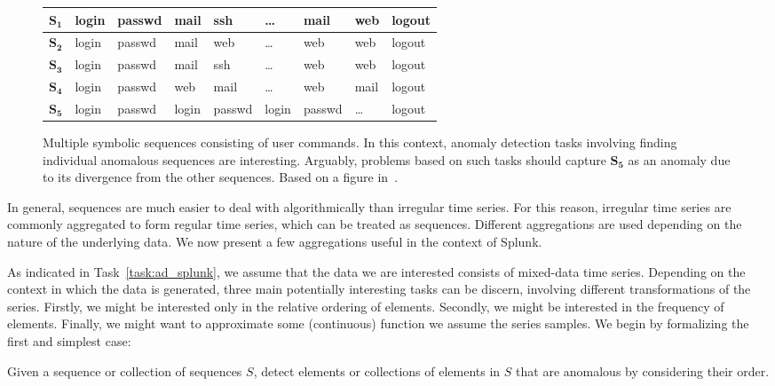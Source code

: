 \begin{figure}[htb]
    \begin{center}
        \begin{tabular}{| l | l l l l l l l l |}
            \hline
            $\mathbf{S_1}$ & login & passwd & mail & ssh & \dots & mail & web & logout \\ \hline
            $\mathbf{S_2}$ & login & passwd & mail & web & \dots & web & web & logout \\ \hline
            $\mathbf{S_3}$ & login & passwd & mail & ssh & \dots & web & web & logout \\ \hline
            $\mathbf{S_4}$ & login & passwd & web & mail & \dots & web & mail & logout \\ \hline
            $\mathbf{S_5}$ & login & passwd & login & passwd & login & passwd & \dots & logout \\\hline
        \end{tabular}
    \end{center}
    \caption{{\small Multiple symbolic sequences consisting of user commands. In this context, anomaly detection tasks involving finding individual anomalous sequences are interesting. Arguably, problems based on such tasks should capture $\mathbf{S_5}$ as an anomaly due to its divergence from the other sequences. Based on a figure in~\cite{chandola2}.}}
\label{fig:calls}
\end{figure}

In general, sequences are much easier to deal with algorithmically than irregular time series. For this reason, irregular time series are commonly aggregated to form regular time series, which can be treated as sequences. Different aggregations are used depending on the nature of the underlying data. We now present a few aggregations useful in the context of Splunk.

As indicated in Task~\ref{task:ad_splunk}, we assume that the data we are interested consists of mixed-data time series. Depending on the context in which the data is generated, three main potentially interesting tasks can be discern, involving different transformations of the series. Firstly, we might be interested only in the relative ordering of elements. Secondly, we might be interested in the frequency of elements. Finally, we might want to approximate some (continuous) function we assume the series samples. We begin by formalizing the first and simplest case:

\begin{task}
\label{task:sequential_anomaly_detection}
  Given a sequence or collection of sequences $S$, detect elements or collections of elements in $S$ that are anomalous by considering their order.
\end{task}

